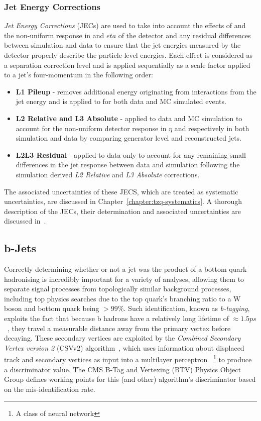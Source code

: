 \subsubsection{Jet Energy Corrections}
\emph{Jet Energy Corrections} (JECs) are used to take into account the effects of \PU and the non-uniform response in \pT and $eta$ of the detector and any residual differences between simulation and data to ensure that the jet energies measured by the detector properly describe the particle-level energies.
Each effect is considered as a separation correction level and is applied sequentially as a scale factor applied to a jet's four-momentum in the following order:

\begin{itemize}
\item \textbf{L1 Pileup} - removes additional energy originating from \PU interactions from the jet energy and is applied to for both data and MC simulated events. 
\item \textbf{L2 Relative and L3 Absolute} - applied to data and MC simulation to account for the non-uniform detector response in $\eta$ and \pT respectively in both simulation and data by comparing generator level and reconstructed jets.
\item \textbf{L2L3 Residual} - applied to data only to account for any remaining small differences in the jet response between data and simulation following the simulation derived \emph{L2 Relative} and \emph{L3 Absolute} corrections.
\end{itemize}

The associated uncertainties of these JECS, which are treated as systematic uncertainties, are discussed in Chapter~\ref{chapter:tzq-systematics}.
A thorough description of the JECs, their determination and associated uncertainties are discussed in~\cite{Khachatryan:2016kdb}.

\subsection{b-Jets}
Correctly determining whether or not a jet was the product of a bottom quark hadronising is incredibly important for a variety of analyses, allowing them to separate signal processes from topologically similar background processes, including top physics searches due to the top quark's branching ratio to a W boson and bottom quark being $> 99\%$.
Such identification, known as \emph{b-tagging}, exploits the fact that because b hadrons have a relatively long lifetime of $\approx 1.5 ps$~\cite{Beringer:1900zz}, they travel a measurable distance away from the primary vertex before decaying. 
These secondary vertices are exploited by the \emph{Combined Secondary Vertex version 2} (CSVv2) algorithm~\cite{Chatrchyan:2012jua,CMS:206kkf}, which uses information about displaced track and secondary vertices as input into a multilayer perceptron ~\footnote{A class of neural network} to produce a discriminator value.
The CMS B-Tag and Vertexing (BTV) Physics Object Group defines working points for this (and other) algorithm's discriminator based on the mis-identification rate.

